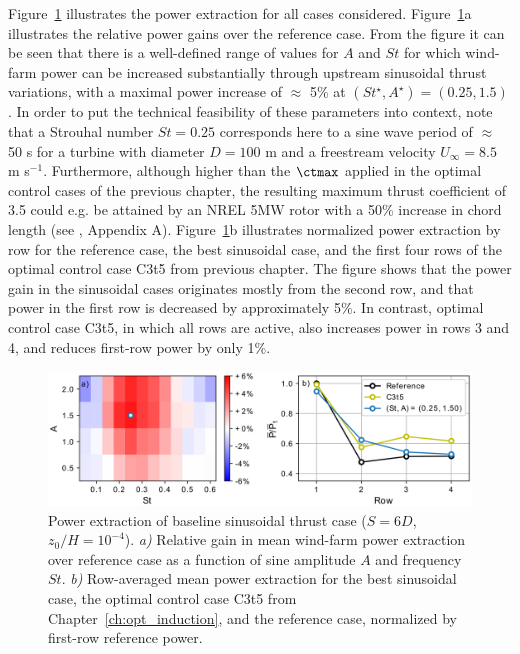 Figure~\ref{fig:sinus_baseline} illustrates the power extraction for all cases considered. Figure~\ref{fig:sinus_baseline}a illustrates the relative power gains over the reference case. From the figure it can be seen that there is a well-defined range of values for $A$ and $St$ for which wind-farm power can be increased substantially through upstream sinusoidal thrust variations, with a maximal power increase of $\approx$ 5\% at $(St^\star, A^\star) = (0.25, 1.5)$. In order to put the technical feasibility of these parameters into context, note that a Strouhal number $St = 0.25$ corresponds here to a sine wave period of $\approx$ 50 s for a turbine with diameter $D = 100$ m and a freestream velocity $U_\infty = 8.5$ m s$^{-1}$. Furthermore, although higher than the $\ctmax$ applied in the optimal control cases of the previous chapter, the resulting maximum thrust coefficient of 3.5 could e.g. be attained by an NREL 5MW rotor with a 50\% increase in chord length (see \cite{goit2015optimal}, Appendix A). Figure~\ref{fig:sinus_baseline}b illustrates normalized power extraction by row for the reference case, the best sinusoidal case, and the first four rows of the optimal control case C3t5 from previous chapter. The figure shows that the power gain in the sinusoidal cases originates mostly from the second row, and that power in the first row is decreased by approximately 5\%. In contrast, optimal control case C3t5, in which all rows are active, also increases power in rows 3 and 4, and reduces first-row power by only 1\%. 
\begin{figure}
	\centering
	\includegraphics[width=\textwidth]{chapters/analysis_induction_control/gains_turbulent_6D_6D_6D_wide_inphase2.eps}
	\caption{Power extraction of baseline sinusoidal thrust case ($S = 6D$, $z_0/H = 10^{-4}$). \emph{a) } Relative gain in mean wind-farm power extraction over reference case as a function of sine amplitude $A$ and frequency $St$. \emph{b) } Row-averaged mean power extraction for the best sinusoidal case, the optimal control case C3t5 from Chapter~\ref{ch:opt_induction}, and the reference case, normalized by first-row reference power.\label{fig:sinus_baseline} }
\end{figure}

